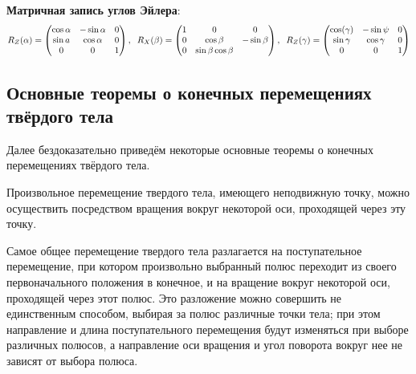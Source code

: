 \phantom{42}

\noindent
\textbf{Матричная запись углов Эйлера}:
\begin{equation}
    R_Z(\alpha) = \begin{pmatrix}
        \cos \alpha & - \sin \alpha & 0 \\
        \sin    a & \cos\alpha & 0 \\
        0 & 0 & 1\\
    \end{pmatrix},
    \hspace{0.2cm} 
    R_X(\beta) = \begin{pmatrix}
        1 & 0 & 0 \\
        0 & \cos \beta & -\sin \beta \\
        0 & \sin \beta \cos \beta \\
    \end{pmatrix},
    \hspace{0.2cm} 
    R_Z (\gamma) = \begin{pmatrix}
        \cos(\gamma) & - \sin \psi & 0 \\
        \sin \gamma & \cos \gamma & 0\\
        0 & 0 & 1
    \end{pmatrix}
\end{equation}

\subsection{Основные теоремы о конечных перемещениях твёрдого тела}


Далее бездоказательно приведём некоторые основные теоремы о конечных перемещениях твёрдого тела.

\begin{to_thr}
     Произвольное перемещение твердого тела, имеющего неподвижную точку, можно осуществить посредством вращения вокруг некоторой оси, проходящей через эту точку. 
\end{to_thr}

\begin{to_thr}
     Самое общее перемещение твердого тела разлагается на поступательное перемещение, при котором произвольно выбранный полюс переходит из своего первоначального положения в конечное, и на вращение вокруг некоторой оси, проходящей через этот полюс. Это разложение можно совершить не единственным способом, выбирая за полюс различные точки тела; при этом направление и длина поступательного перемещения будут изменяться при выборе различных 
полюсов, а направление оси вращения и угол поворота вокруг нее не зависят от выбора полюса. 
\end{to_thr}

